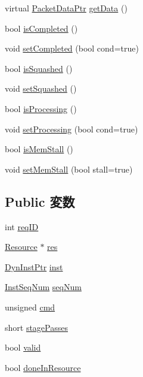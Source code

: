 \begin{DoxyCompactItemize}
virtual \hyperlink{packet_8hh_ae85a9de970f801a77a1ad88ee2b39ea2}{PacketDataPtr} \hyperlink{classResourceRequest_a050fcb534c3978b1caf1556a4102e320}{getData} ()
\item 
bool \hyperlink{classResourceRequest_a28b8c4c5a1c1cf6eccad84a6b2f7447a}{isCompleted} ()
\item 
void \hyperlink{classResourceRequest_ac2df3f74e87d10a17911104bd883e133}{setCompleted} (bool cond=true)
\item 
bool \hyperlink{classResourceRequest_af8f4f2dfe302bcda3af55ee563453f16}{isSquashed} ()
\item 
void \hyperlink{classResourceRequest_abfa7b30b342b5ef70b7e060b305a2f94}{setSquashed} ()
\item 
bool \hyperlink{classResourceRequest_a999eb8f93352944b405abea521ae61a0}{isProcessing} ()
\item 
void \hyperlink{classResourceRequest_a4e0df5e5228a9ecbc5192005e306b700}{setProcessing} (bool cond=true)
\item 
bool \hyperlink{classResourceRequest_a88a0f9eb3847a81772a1eb7a16143f4d}{isMemStall} ()
\item 
void \hyperlink{classResourceRequest_a3cd636f9020a019c1b06e7aa5e460c6f}{setMemStall} (bool stall=true)
\end{DoxyCompactItemize}
\subsection*{Public 変数}
\begin{DoxyCompactItemize}
\item 
int \hyperlink{classResourceRequest_a1aca8b542ab3f88cf90f9d0159ab70d3}{reqID}
\item 
\hyperlink{classResource}{Resource} $\ast$ \hyperlink{classResourceRequest_ae6cb01f81685fa77e8716cdef5924b8a}{res}
\item 
\hyperlink{classRefCountingPtr}{DynInstPtr} \hyperlink{classResourceRequest_af5d4fb974eeb4507d4c837d365d0cefc}{inst}
\item 
\hyperlink{inst__seq_8hh_a258d93d98edaedee089435c19ea2ea2e}{InstSeqNum} \hyperlink{classResourceRequest_af9da73f56d2d0e7fd5009b70c4cf3542}{seqNum}
\item 
unsigned \hyperlink{classResourceRequest_ab3d2004723874364229cf4339bb129fb}{cmd}
\item 
short \hyperlink{classResourceRequest_a48e838358cea6d9b841754a78c089269}{stagePasses}
\item 
bool \hyperlink{classResourceRequest_a28e3c179a86f337095088b3ca02a2b2a}{valid}
\item 
bool \hyperlink{classResourceRequest_aaa0cc53e901d33d020b79194529d18c1}{doneInResource}
\end{DoxyCompactItemize}
